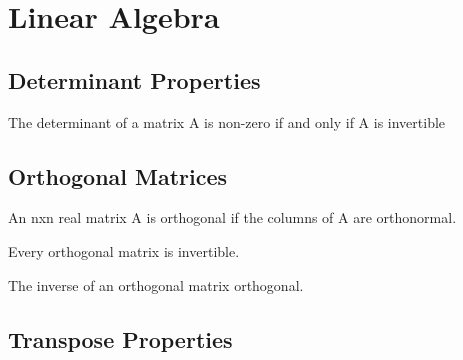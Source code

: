 \chapter{Linear Algebra}


\section{Determinant Properties}
\begin{theorem}
	The determinant of a matrix A is non-zero if and only if A is invertible 
\end{theorem}

\section{Orthogonal Matrices}
\begin{definition}
	An nxn real matrix A is orthogonal if the columns of A are orthonormal.
\end{definition}
\begin{theorem}
	Every orthogonal matrix is invertible.
\end{theorem}
\begin{theorem}
	The inverse of an orthogonal matrix orthogonal.
\end{theorem}

\section{Transpose Properties}

